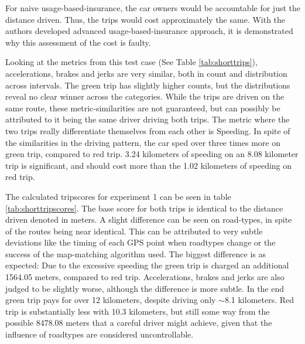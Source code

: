 For naive usage-based-insurance, the car owners would be accountable for just the distance driven. Thus, the trips would cost approximately the same. With the authors developed advanced usage-based-insurance approach, it is demonstrated why this assessment of the cost is faulty.

Looking at the metrics from this test case (See Table  \ref{tab:shorttrips}), accelerations, brakes and jerks are very similar, both in count and distribution across intervals. The green trip has slightly higher counts, but the distributions reveal no clear winner across the categories. While the trips are driven on the same route, these metric-similarities are not guaranteed, but can possibly be attributed to it being the same driver driving both trips. The metric where the two trips really differentiate themselves from each other is Speeding. In spite of the similarities in the driving pattern, the car sped over three times more on green trip, compared to red trip. 3.24 kilometers of speeding on an 8.08 kilometer trip is significant, and should cost more than the 1.02 kilometers of speeding on red trip.

The calculated tripscores for experiment 1 can be seen in table \ref{tab:shorttripscores}. The base score for both trips is identical to the distance driven denoted in meters. A slight difference can be seen on road-types, in spite of the routes being near identical. This can be attributed to very subtle deviations like the timing of each GPS point when roadtypes change or the success of the map-matching algorithm used. The biggest difference is as expected: Due to the excessive speeding the green trip is charged an additional 1564.05 meters, compared to red trip. Accelerations, brakes and jerks are also judged to be slightly worse, although the difference is more subtle. In the end green trip pays for over 12 kilometers, despite driving only $\sim$8.1 kilometers. Red trip is substantially less with 10.3 kilometers, but still some way from the possible 8478.08 meters that a careful driver might achieve, given that the influence of roadtypes are considered uncontrollable.

